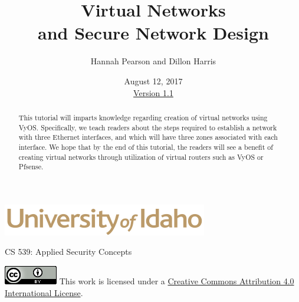 \documentclass[12pt]{article}
\begin{document}
\title{ Virtual Networks \\ \large and Secure Network Design}
\author{Hannah Pearson and Dillon Harris}
\date{August 12, 2017 \\ \hyperref[changelog]{Version 1.1}} %
\renewcommand{\abstractname}{Executive Summary}
\begin{titlepage}
\maketitle
\keepthetitle %
\begin{center}
\includegraphics[scale=.5]{UofI}

\large{CS 539: Applied Security Concepts}

\vskip 40pt

\end{center}
\begin{abstract}
This tutorial will imparts knowledge regarding creation of virtual networks using VyOS. Specifically, we teach readers about the steps required to establish a network with three Ethernet interfaces, and which will have three zones associated with each interface. We hope that by the end of this tutorial, the readers will see a benefit of creating virtual networks through utilization of virtual routers such as VyOS or Pfsense.
\end{abstract}


\vfill
\begin{center}
	\includegraphics[scale=0.5]{cc}
	\vskip 10pt
	This work is licensed under a \href{https://creativecommons.org/licenses/by/4.0/}{Creative Commons Attribution 4.0 International License}.
\end{center}

\end{titlepage}


\pagebreak
\tableofcontents

\end{document}
